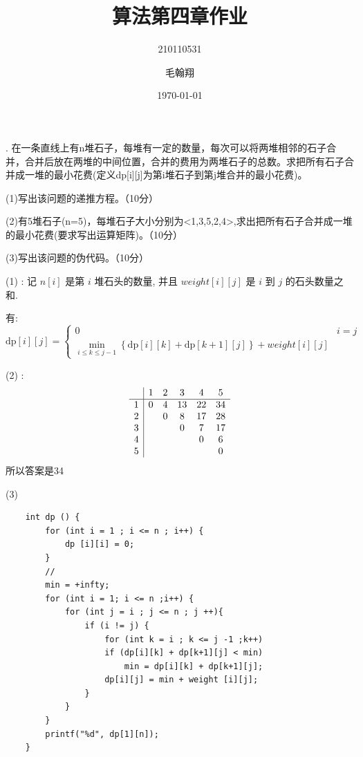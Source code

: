 \documentclass[a4paper, 10pt]{ctexart} %
\title{算法第四章作业}
\author{210110531 \and 毛翰翔}
\date{\today}
\begin{document}
. 
在一条直线上有n堆石子，每堆有一定的数量，每次可以将两堆相邻的石子合并，合并后放在两堆的中间位置，合并的费用为两堆石子的总数。求把所有石子合并成一堆的最小花费(定义dp[i][j]为第i堆石子到第j堆合并的最小花费)。

(1)写出该问题的递推方程。（10分）

(2)有5堆石子(n=5)，每堆石子大小分别为<1,3,5,2,4>,求出把所有石子合并成一堆的最小花费(要求写出运算矩阵)。（10分）

(3)写出该问题的伪代码。（10分）


(1) : 
记 $n \left[ i \right]$ 是第 $i$ 堆石头的数量, 并且 $weight \left[  i \right] \left[ j \right]$ 是 $i$ 到 $j$ 的石头数量之和. 

有: 
\[
\text{dp}[i][j]  = 
\begin{cases}
    0 & i = j \\ 
    \min_{i \le k \le j-1} \left\{\text{dp}[i][k] + \text{dp} [k+1] [j]\right\} + weight [i][j]
\end{cases}
\]

(2) :
\[
    \begin{array}{c | c c c c c}
        & 1&2&3&4&5
        \\ 
        \hline 
        1& 0 & 4 & 13 & 22 & 34 \\ 
        2& & 0 & 8 & 17 & 28 \\ 
        3& & & 0 & 7 & 17 \\ 
        4& & & & 0 & 6 \\ 
        5& & & & & 0 \\
    \end{array}
\]
所以答案是34

(3)

\begin{verbatim}
    int dp () {
        for (int i = 1 ; i <= n ; i++) {
            dp [i][i] = 0;
        }
        // 
        min = +infty;
        for (int i = 1; i <= n ;i++) {
            for (int j = i ; j <= n ; j ++){
                if (i != j) {
                    for (int k = i ; k <= j -1 ;k++)
                    if (dp[i][k] + dp[k+1][j] < min)
                        min = dp[i][k] + dp[k+1][j];
                    dp[i][j] = min + weight [i][j];
                }
            }
        }
        printf("%d", dp[1][n]);
    }
\end{verbatim}
\end{document}
